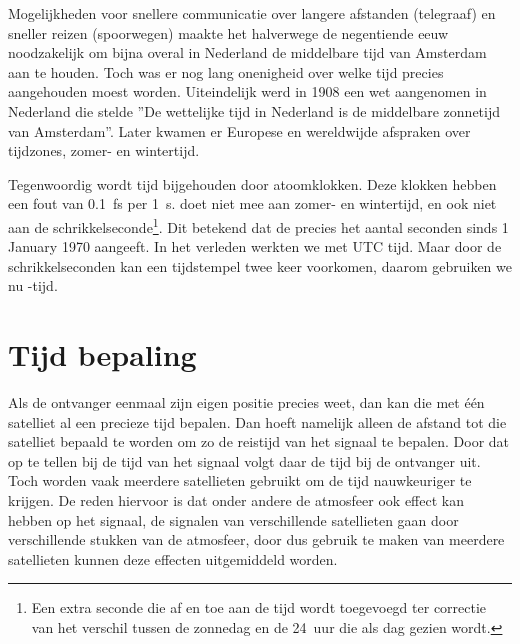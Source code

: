 Mogelijkheden voor snellere communicatie over langere afstanden
(telegraaf) en sneller reizen (spoorwegen) maakte het halverwege de
negentiende eeuw noodzakelijk om bijna overal in Nederland de middelbare
tijd van Amsterdam aan te houden. Toch was er nog lang onenigheid over
welke tijd precies aangehouden moest worden. Uiteindelijk werd in 1908
een wet aangenomen in Nederland die stelde ''De wettelijke tijd in
Nederland is de middelbare zonnetijd van Amsterdam''. Later kwamen er
Europese en wereldwijde afspraken over tijdzones, zomer- en wintertijd.

Tegenwoordig wordt tijd bijgehouden door atoomklokken. Deze klokken
hebben een fout van \SI{0.1}{\femto\second} per \SI{1}{\second}. \gps
doet niet mee aan zomer- en wintertijd, en ook niet aan de
schrikkelseconde\footnote{Een extra seconde die af en toe aan de tijd
wordt toegevoegd ter correctie van het verschil tussen de zonnedag en de
\SI{24}{uur} die als dag gezien wordt.}. Dit betekend dat de \gps
precies het aantal seconden sinds 1 January 1970 aangeeft. In het
verleden werkten we met UTC tijd. Maar door de schrikkelseconden kan een
tijdstempel twee keer voorkomen, daarom gebruiken we nu \gps-tijd.


\section{Tijd bepaling}

Als de ontvanger eenmaal zijn eigen positie precies weet, dan kan die
met één satelliet al een precieze tijd bepalen. Dan hoeft namelijk
alleen de afstand tot die satelliet bepaald te worden om zo de reistijd
van het signaal te bepalen. Door dat op te tellen bij de tijd van het
signaal volgt daar de tijd bij de ontvanger uit. Toch worden vaak
meerdere satellieten gebruikt om de tijd nauwkeuriger te krijgen. De
reden hiervoor is dat onder andere de atmosfeer ook effect kan hebben op
het signaal, de signalen van verschillende satellieten gaan door
verschillende stukken van de atmosfeer, door dus gebruik te maken van
meerdere satellieten kunnen deze effecten uitgemiddeld worden.

